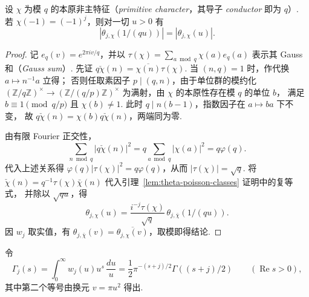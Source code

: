 \begin{lemma}
\label{lem:theta-primitive-symmetry}
\emitthmsource
设 $\chi$ 为模 $q$ 的本原非主特征（\emph{primitive character}，其导子 \emph{conductor} 即为 $q$）. 若 $\chi(-1)=(-1)^j$，则对一切 $u>0$ 有
\[
 |\theta_{j,\chi}(1/(qu))|=|\theta_{j,\chi}(u)|.
\]
\end{lemma}
\begin{proof}
记 $e_q(v)=e^{2\pi iv/q}$，并以 $\tau(\chi)=\sum_{a\bmod q}\chi(a)e_q(a)$ 表示其 Gauss 和（\emph{Gauss sum}）.
先证 $q\check\chi(n)=\overline{\chi(n)}\tau(\chi)$. 当 $(n,q)=1$ 时，作代换 $a\mapsto n^{-1}a$ 立得；
否则任取素因子 $p\mid(q,n)$，由于单位群的模约化 $(\mathbb Z/q\mathbb Z)^\times\to(\mathbb Z/(q/p)\mathbb Z)^\times$ 为满射，由 $\chi$ 的本原性存在模 $q$ 的单位 $b$，
满足 $b\equiv1\pmod{q/p}$ 且 $\chi(b)\ne1$. 此时 $q\mid n(b-1)$，指数因子在 $a\mapsto ba$ 下不变，
故 $q\check\chi(n)=\chi(b)q\check\chi(n)$，两端同为零.

由有限 Fourier 正交性，
\[
 \sum_{n\bmod q}|q\check\chi(n)|^2=q\sum_{a\bmod q}|\chi(a)|^2=q\varphi(q).
\]
代入上述关系得 $\varphi(q)|\tau(\chi)|^2=q\varphi(q)$，从而 $|\tau(\chi)|=\sqrt q$.
将 $\check\chi(n)=q^{-1}\tau(\chi)\bar\chi(n)$ 代入引理~\ref{lem:theta-poisson-classes} 证明中的复等式，
并除以 $\sqrt{qu}$，得
\[
 \theta_{j,\chi}(u)=\frac{i^{-j}\tau(\chi)}{\sqrt q}\,
                         \theta_{j,\bar\chi}(1/(qu)).
\]
因 $w_j$ 取实值，有 $\theta_{j,\bar\chi}(v)=\overline{\theta_{j,\chi}(v)}$，取模即得结论.
\end{proof}

令
\[
 \Gamma_j(s)=\int_0^\infty w_j(u)u^s\,\frac{du}{u}
              =\frac12\pi^{-(s+j)/2}\Gamma((s+j)/2)
 \qquad(\operatorname{Re}s>0),
\]
其中第二个等号由换元 $v=\pi u^2$ 得出.

